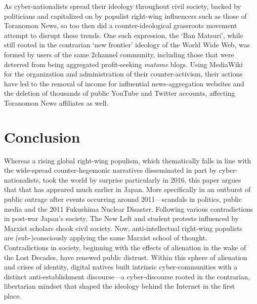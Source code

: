 \documentclass[10pt,british,A4paper,twoside]{memoir}
\begin{document}
As cyber-nationalists spread their ideology throughout civil
society, backed by politicians and capitalized on by populist right-wing
influencers such as those of Toranomon News, so too then did a
counter-ideological grassroots movement attempt to disrupt these trends.
One such expression, the `Ban Matsuri', while still rooted in the
contrarian `new frontier' ideology of the World Wide Web, was formed by
users of the same 2channel community, including those that were deterred
from being aggregated profit-seeking \emph{matome} blogs. Using
MediaWiki for the organization and administration of their
counter-activism, their actions have led to the removal of income for
influential news-aggregation websites and the deletion of thousands of
public YouTube and Twitter accounts, affecting Toranomon News affiliates
as well.

\newpage

\chapter*{Conclusion}

Whereas a rising global right-wing populism, which thematically falls in
line with the wide-spread counter-hegemonic narratives disseminated in
part by cyber-nationalists, took the world by surprise particularly in
2016, this paper argues that that has appeared much earlier in Japan.
More specifically in an outburst of public outrage after events
occurring around 2011---scandals in politics, public media and the 2011
Fukushima Nuclear Disaster. Following various contradictions in post-war
Japan's society, The New Left and student protests influenced by Marxist
scholars shook civil society. Now, anti-intellectual right-wing
populists are (sub-)consciously applying the same Marxist school of
thought. Contradictions in society, beginning with the effects of
alienation in the wake of the Lost Decades, have renewed public
distrust. Within this sphere of alienation and crises of identity,
digital natives built intrinsic cyber-communities with a distinct
anti-establishment discourse---a cyber-discourse rooted in the
contrarian, libertarian mindset that shaped the ideology behind the
Internet in the first place.
\end{document}
